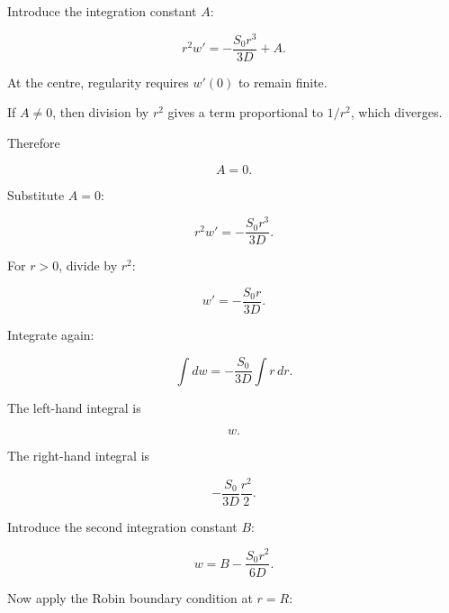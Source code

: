 \documentclass[11pt,a4paper]{article}
\begin{document}
Introduce the integration constant $A$:

\begin{equation}
r^2w'
=
-\frac{S_0r^3}{3D}
+
A.
\tag{TRISO-ANA-113}
\label{eq:triso-ana-113}
\end{equation}

At the centre, regularity requires $w'(0)$ to remain finite.

If $A\ne0$, then division by $r^2$ gives a term proportional to $1/r^2$, which diverges.

Therefore

\begin{equation}
A=0.
\tag{TRISO-ANA-114}
\label{eq:triso-ana-114}
\end{equation}

Substitute $A=0$:

\begin{equation}
r^2w'
=
-\frac{S_0r^3}{3D}.
\tag{TRISO-ANA-115}
\label{eq:triso-ana-115}
\end{equation}

For $r>0$, divide by $r^2$:

\begin{equation}
w'
=
-\frac{S_0r}{3D}.
\tag{TRISO-ANA-116}
\label{eq:triso-ana-116}
\end{equation}

Integrate again:

\begin{equation}
\int dw
=
-\frac{S_0}{3D}\int r\,dr.
\tag{TRISO-ANA-117}
\label{eq:triso-ana-117}
\end{equation}

The left-hand integral is

\begin{equation}
w.
\tag{TRISO-ANA-118}
\label{eq:triso-ana-118}
\end{equation}

The right-hand integral is

\begin{equation}
-\frac{S_0}{3D}\frac{r^2}{2}.
\tag{TRISO-ANA-119}
\label{eq:triso-ana-119}
\end{equation}

Introduce the second integration constant $B$:

\begin{equation}
w
=
B
-
\frac{S_0r^2}{6D}.
\tag{TRISO-ANA-120}
\label{eq:triso-ana-120}
\end{equation}

Now apply the Robin boundary condition at $r=R$:
\end{document}
